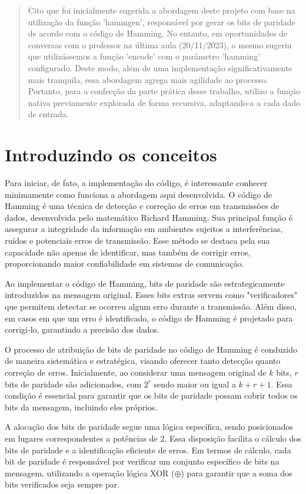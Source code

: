 \documentclass{article}
\begin{document}
\begin{abstract}
Cito que foi inicialmente sugerida a abordagem deste projeto com base na utilização da função 'hammgen', responsável por gerar  os bits de paridade de acordo com o código de Hamming. No entanto, em oportunidades de conversas com o professor na última aula (20/11/2023), o mesmo sugeriu que utilizássemos a função 'encode' com o parâmetro 'hamming' configurado. Deste modo, além de uma implementação significativamente mais tranquila, essa abordagem agrega mais agilidade ao processo. Portanto, para a confecção da parte prática desse trabalho, utilizo a função nativa previamente explorada de forma recursiva, adaptando-a a cada dado de entrada.

\end{abstract}

\section{Introduzindo os conceitos}

Para iniciar, de fato, a implementação do código, é interessante conhecer minimamente como funciona a abordagem aqui desenvolvida. O código de Hamming é uma técnica de detecção e correção de erros em transmissões de dados, desenvolvida pelo matemático Richard Hamming. Sua principal função é assegurar a integridade da informação em ambientes sujeitos a interferências, ruídos e potenciais erros de transmissão. Esse método se destaca pela sua capacidade não apenas de identificar, mas também de corrigir erros, proporcionando maior confiabilidade em sistemas de comunicação.

Ao implementar o código de Hamming, bits de paridade são estrategicamente introduzidos na mensagem original. Esses bits extras servem como "verificadores" que permitem detectar se ocorreu algum erro durante a transmissão. Além disso, em casos em que um erro é identificado, o código de Hamming é projetado para corrigi-lo, garantindo a precisão dos dados.

O processo de atribuição de bits de paridade no código de Hamming é conduzido de maneira sistemática e estratégica, visando oferecer tanto detecção quanto correção de erros. Inicialmente, ao considerar uma mensagem original de \( k \) bits, \( r \) bits de paridade são adicionados, com \( 2^r \) sendo maior ou igual a \( k + r + 1 \). Essa condição é essencial para garantir que os bits de paridade possam cobrir todos os bits da mensagem, incluindo eles próprios.

A alocação dos bits de paridade segue uma lógica específica, sendo posicionados em lugares correspondentes a potências de 2. Essa disposição facilita o cálculo dos bits de paridade e a identificação eficiente de erros. Em termos de cálculo, cada bit de paridade é responsável por verificar um conjunto específico de bits na mensagem, utilizando a operação lógica XOR (\(\oplus\)) para garantir que a soma dos bits verificados seja sempre par.
\end{document}
